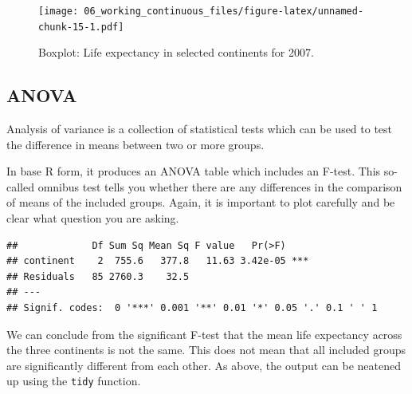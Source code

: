 \documentclass[
  12pt,
  krantz2]{krantz}
\makeatletter
\newenvironment{Shaded}{\begin{snugshade}}{\end{snugshade}}
\newcommand{\DataTypeTok}[1]{\textcolor[rgb]{0.13,0.29,0.53}{#1}}
\newcommand{\DecValTok}[1]{\textcolor[rgb]{0.00,0.00,0.81}{#1}}
\newcommand{\KeywordTok}[1]{\textcolor[rgb]{0.13,0.29,0.53}{\textbf{#1}}}
\newcommand{\NormalTok}[1]{#1}
\newcommand{\OperatorTok}[1]{\textcolor[rgb]{0.81,0.36,0.00}{\textbf{#1}}}
\newcommand{\StringTok}[1]{\textcolor[rgb]{0.31,0.60,0.02}{#1}}
\newenvironment{kframe}{%
\medskip{}
\setlength{\fboxsep}{.8em}
 \def\at@end@of@kframe{}%
 \ifinner\ifhmode%
  \def\at@end@of@kframe{\end{minipage}}%
  \begin{minipage}{\columnwidth}%
 \fi\fi%
 \def\FrameCommand##1{\hskip\@totalleftmargin \hskip-\fboxsep
 \colorbox{shadecolor}{##1}\hskip-\fboxsep
     \hskip-\linewidth \hskip-\@totalleftmargin \hskip\columnwidth}%
 \MakeFramed {\advance\hsize-\width
   \@totalleftmargin\z@ \linewidth\hsize
   \@setminipage}}%
 {\par\unskip\endMakeFramed%
 \at@end@of@kframe}
\renewenvironment{Shaded}{\begin{kframe}}{\end{kframe}}
\makeatother
\begin{document}
\begin{figure}
\centering
\texttt{[image: 06\_working\_continuous\_files/figure-latex/unnamed-chunk-15-1.pdf]}
\caption{\label{fig:unnamed-chunk-15}Boxplot: Life expectancy in selected continents for 2007.}
\end{figure}

\hypertarget{anova}{%
\subsection{ANOVA}\label{anova}}


Analysis of variance is a collection of statistical tests which can be used to test the difference in means between two or more groups.

In base R form, it produces an ANOVA table which includes an F-test.
This so-called omnibus test tells you whether there are any differences in the comparison of means of the included groups.
Again, it is important to plot carefully and be clear what question you are asking.

\begin{Shaded}
\end{Shaded}

\begin{verbatim}
##             Df Sum Sq Mean Sq F value   Pr(>F)    
## continent    2  755.6   377.8   11.63 3.42e-05 ***
## Residuals   85 2760.3    32.5                     
## ---
## Signif. codes:  0 '***' 0.001 '**' 0.01 '*' 0.05 '.' 0.1 ' ' 1
\end{verbatim}


We can conclude from the significant F-test that the mean life expectancy across the three continents is not the same.
This does not mean that all included groups are significantly different from each other.
As above, the output can be neatened up using the \texttt{tidy} function.
\end{document}
